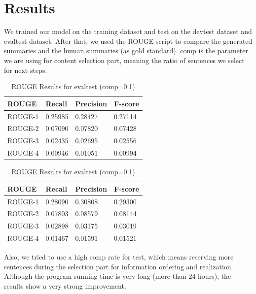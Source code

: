 \documentclass[11pt]{article}
\begin{document}
\section{Results}

We trained our model on the training dataset and test on the devtest dataset and evaltest dataset. After that, we used the ROUGE script to compare the generated summaries and the human summaries (as gold standard). comp is the parameter we are using for content selection part, meaning the ratio of sentences we select for next steps. 
\begin{table}[!ht]
\centering
\caption{ROUGE Results for devtest (comp=0.1)}
\begin{tabular}{|l|l|l|l|}
\hline
ROUGE   & Recall  & Precision & F-score \\ \hline
ROUGE-1 & 0.25985 & 0.28427   & 0.27114 \\ \hline
ROUGE-2 & 0.07090 & 0.07820   & 0.07428 \\ \hline
ROUGE-3 & 0.02435 & 0.02695   & 0.02556 \\ \hline
ROUGE-4 & 0.00946 & 0.01051   & 0.00994 \\ \hline
\end{tabular}
\caption{ROUGE Results for evaltest (comp=0.1)}
\begin{tabular}{|l|l|l|l|}
\hline
ROUGE   & Recall  & Precision & F-score \\ \hline
ROUGE-1 & 0.28090 & 0.30808   & 0.29300 \\ \hline
ROUGE-2 & 0.07803 & 0.08579   & 0.08144 \\ \hline
ROUGE-3 & 0.02898 & 0.03175   & 0.03019 \\ \hline
ROUGE-4 & 0.01467 & 0.01591   & 0.01521 \\ \hline
\end{tabular}
\end{table}
Also, we tried to use a high comp rate for test, which means reserving more sentences during the selection part for information ordering and realization. Although the program running time is very long (more than 24 hours), the results show a very strong improvement.
\end{document}
